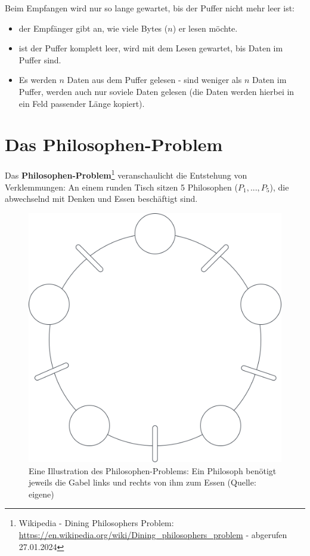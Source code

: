 Beim Empfangen wird nur so lange gewartet, bis der Puffer nicht mehr leer ist:
\begin{itemize}
    \item der Empfänger gibt an, wie viele Bytes ($n$) er lesen möchte.
    \item ist der Puffer komplett leer, wird mit dem Lesen gewartet, bis Daten im Puffer sind.
    \item Es werden $n$ Daten aus dem Puffer gelesen - sind weniger als $n$ Daten im Puffer, werden auch nur soviele Daten gelesen (die Daten werden hierbei in ein Feld passender Länge kopiert).
\end{itemize}

\section{Das Philosophen-Problem}
 Das \textbf{Philosophen-Problem}\footnote{
Wikipedia - Dining Philosophers Problem: \url{https://en.wikipedia.org/wiki/Dining_philosophers_problem} - abgerufen 27.01.2024
}
veranschaulicht die Entstehung von Verklemmungen: An einem runden Tisch sitzen 5 Philosophen ($P_1,...,P_5$), die abwechselnd mit Denken und Essen beschäftigt sind.\\

\begin{figure}
    \centering
    \includegraphics[scale=0.25]{chapters/3/img/philosopher}
    \caption{ Eine Illustration des Philosophen-Problems: Ein Philosoph benötigt jeweils die Gabel links und rechts von ihm zum Essen (Quelle: eigene)}
    \label{fig:philosopher}
\end{figure}


